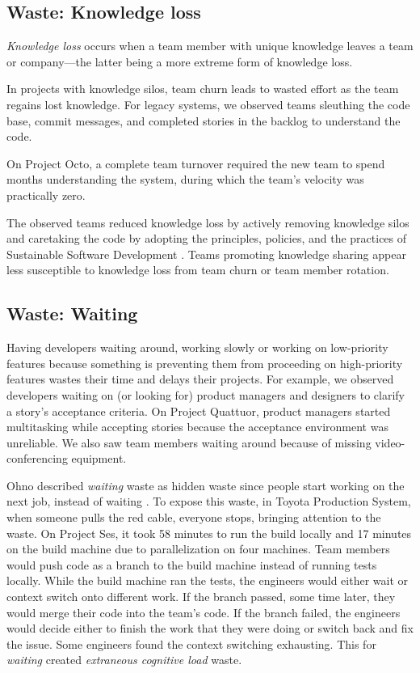 \subsection{Waste: Knowledge loss}
\textit{Knowledge loss} occurs when a team member with unique knowledge leaves a team or company---the latter being a more extreme form of knowledge loss.

In projects with knowledge silos, team churn leads to wasted effort as the team regains lost knowledge. For legacy systems, we observed teams sleuthing the code base, commit messages, and completed stories in the backlog to understand the code.  

On Project Octo, a complete team turnover required the new team to spend months understanding the system, during which the team's velocity was practically zero.

The observed teams reduced knowledge loss by actively removing knowledge silos and caretaking the code by adopting the principles, policies, and the practices of Sustainable Software Development \cite{SedanoSustainableSoftware}. Teams promoting knowledge sharing appear less susceptible to knowledge loss from team churn or team member rotation. 

\subsection{Waste: Waiting}
Having developers waiting around, working slowly or working on low-priority features because something is preventing them from proceeding on high-priority features wastes their time and delays their projects. For example, we observed developers waiting on (or looking for) product managers and designers to clarify a story's acceptance criteria. On Project Quattuor, product managers started multitasking while accepting stories because the acceptance environment was unreliable. We also saw team members waiting around because of missing video-conferencing equipment. 

Ohno described \textit{waiting} waste as hidden waste since people start working on the next job, instead of waiting \cite{OhnoToyotaProductionSystem}. To expose this waste, in Toyota Production System, when someone pulls the red cable, everyone stops, bringing attention to the waste. On Project Ses, it took 58 minutes to run the build locally and 17 minutes on the build machine due to parallelization on four machines. Team members would push code as a branch to the build machine instead of running tests locally. While the build machine ran the tests, the engineers would either wait or context switch onto different work. If the branch passed, some time later, they would merge their code into the team's code. If the branch failed, the engineers would decide either to finish the work that they were doing or switch back and fix the issue. Some engineers found the context switching exhausting. This  for \textit{waiting} created \textit{extraneous cognitive load} waste.

